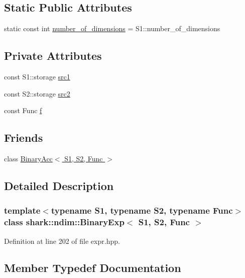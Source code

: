 \subsection*{Static Public Attributes}
\begin{DoxyCompactItemize}
\item 
static const int \hyperlink{classshark_1_1ndim_1_1_binary_exp_ad6fb9c3cca071ad98fe87b3c285a17cf}{number\+\_\+of\+\_\+dimensions} = S1\+::number\+\_\+of\+\_\+dimensions
\end{DoxyCompactItemize}
\subsection*{Private Attributes}
\begin{DoxyCompactItemize}
\item 
const S1\+::storage \hyperlink{classshark_1_1ndim_1_1_binary_exp_adca0646eb1ee123dc4312644a39ffdb6}{src1}
\item 
const S2\+::storage \hyperlink{classshark_1_1ndim_1_1_binary_exp_a42495dbe9f1fdc13b53fc53d21c847a1}{src2}
\item 
const Func \hyperlink{classshark_1_1ndim_1_1_binary_exp_a96d3a36d75f44be439e3550d40135714}{f}
\end{DoxyCompactItemize}
\subsection*{Friends}
\begin{DoxyCompactItemize}
\item 
class \hyperlink{classshark_1_1ndim_1_1_binary_exp_a9059dceb0cce6c1f29ca58228b6746bc}{Binary\+Acc$<$ S1, S2, Func $>$}
\end{DoxyCompactItemize}


\subsection{Detailed Description}
\subsubsection*{template$<$typename S1, typename S2, typename Func$>$\newline
class shark\+::ndim\+::\+Binary\+Exp$<$ S1, S2, Func $>$}



Definition at line 202 of file expr.\+hpp.



\subsection{Member Typedef Documentation}
\hypertarget{classshark_1_1ndim_1_1_binary_exp_a50255b11a4422c310fb6042fbc5bd306}{}\label{classshark_1_1ndim_1_1_binary_exp_a50255b11a4422c310fb6042fbc5bd306} 
